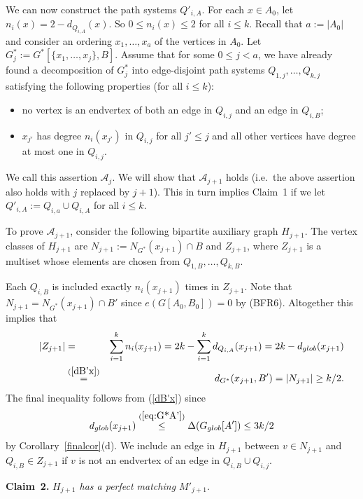 \documentclass{memo-l}
\def\COMMENT#1{}
\numberwithin{section}{chapter}
\numberwithin{equation}{section}
\numberwithin{firstthm}{section}
\numberwithin{figure}{section}
\begin{document}
{We can now construct the path systems $Q'_{i,A}$.  For each $x \in A_0$, let $n_i(x)=2-d_{Q_{i,A}}(x)$.
So $0\le n_i(x)\le 2$ for all $i\le k$.
Recall that $a:=|A_0|$ and consider an ordering $x_1,\dots,x_{a}$ of the vertices in $A_0$.
Let $G^*_j:=G^*[\{x_1,\dots,x_j\},B]$. Assume that for some 
$0 \le j < a$, we have already found a decomposition of $G^*_j$ into edge-disjoint path systems $Q_{1,j},\dots,Q_{k,j}$
satisfying the following properties (for all $i\le k$): 
\begin{itemize}
\item[(i$'$)] no vertex is an endvertex of both an edge in $Q_{i,j}$ and an edge in $Q_{i,B}$;
\item[(ii$'$)] $x_{j'}$ has degree $n_{i}(x_{j'})$ in $Q_{i,j}$ for all $j' \le j$
and all other vertices have degree at most one in $Q_{i,j}$.
\end{itemize}
We call this assertion ${\mathcal A}_j$. We will show that ${\mathcal A}_{j+1}$ holds 
(i.e.~the above assertion also holds with $j$ replaced by $j+1$).
This in turn implies Claim~1 if we let $Q'_{i,A}:=Q_{i,a}\cup Q_{i,A}$ for all $i\le k$.

To prove ${\mathcal A}_{j+1}$, consider the following bipartite auxiliary graph $H_{j+1}$.
The vertex classes of $H_{j+1}$ are $N_{j+1}:=N_{G^*}(x_{j+1})\cap B$ and $Z_{j+1}$, where
$Z_{j+1}$ is a multiset whose elements are chosen from $Q_{1,B},\dots,Q_{k,B}$.%
\COMMENT{AL: joined the two sentences together.}
Each $Q_{i,B}$ is included exactly $n_i(x_{j+1})$ times in $Z_{j+1}$. Note that
$N_{j+1}=N_{G^*}(x_{j+1})\cap B'$ since $e(G[A_0,B_0])=0$ by (BFR6).
Altogether this implies that
\begin{eqnarray}
\ \ \ \ \ \ |Z_{j+1}| & = & \sum_{i=1}^k n_i(x_{j+1})=2k-\sum_{i=1}^k d_{Q_{i,A}}(x_{j+1})=2k-d_{glob}(x_{j+1}) \label{eq:Zjplus1}\\
&  \stackrel{(\ref{dB'x})}{=} & d_{G^*}(x_{j+1},B') =|N_{j+1}| \ge k/2\nonumber.
\end{eqnarray}
The final inequality follows from (\ref{dB'x}) since
$$d_{glob}(x_{j+1})\stackrel{(\ref{eq:G*A'})}{\le} \Delta(G_{glob}[A']) \le 3k/2$$
by Corollary~\ref{finalcor}(d).
We include an edge in $H_{j+1}$ between $v \in N_{j+1}$ and $Q_{i,B} \in Z_{j+1}$ if $v$ is not an endvertex of an edge in 
$Q_{i,B}\cup Q_{i,j}$.

\medskip

\noindent
{\bf Claim~2.} \emph{$H_{j+1}$ has a perfect matching $M'_{j+1}$.}

\medskip

}
\end{document}
